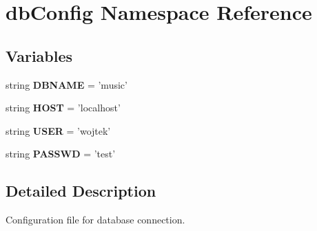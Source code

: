\hypertarget{namespacedbConfig}{\section{db\-Config Namespace Reference}
\label{namespacedbConfig}
}
\subsection*{Variables}
\begin{DoxyCompactItemize}
\item 
\hypertarget{namespacedbConfig_a949986ecf5f2a24833921b6beb2df3b3}{string {\bfseries D\-B\-N\-A\-M\-E} = 'music'}\label{namespacedbConfig_a949986ecf5f2a24833921b6beb2df3b3}

\item 
\hypertarget{namespacedbConfig_a10f3a3730a0b1c5f4f72671e5ae146d4}{string {\bfseries H\-O\-S\-T} = 'localhost'}\label{namespacedbConfig_a10f3a3730a0b1c5f4f72671e5ae146d4}

\item 
\hypertarget{namespacedbConfig_a16b3a8cdc5fc8cfb6eb7172825a8d52e}{string {\bfseries U\-S\-E\-R} = 'wojtek'}\label{namespacedbConfig_a16b3a8cdc5fc8cfb6eb7172825a8d52e}

\item 
\hypertarget{namespacedbConfig_a804e68b91d74ebe81656be75161f3e93}{string {\bfseries P\-A\-S\-S\-W\-D} = 'test'}\label{namespacedbConfig_a804e68b91d74ebe81656be75161f3e93}

\end{DoxyCompactItemize}


\subsection{Detailed Description}
\begin{DoxyVerb}Configuration file for database connection.
\end{DoxyVerb}
 